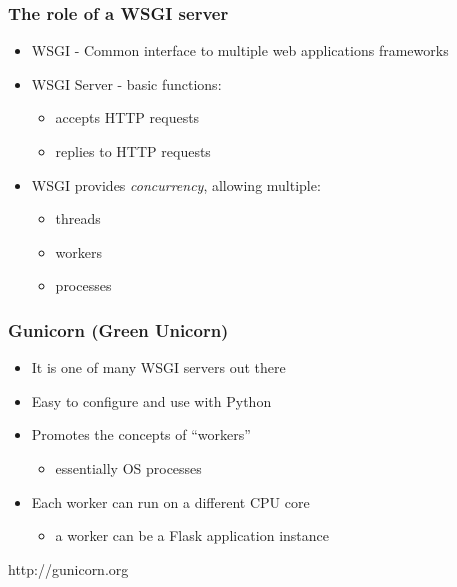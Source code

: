 \documentclass{beamer}
\begin{document}
\begin{frame}
\frametitle<presentation>{The role of a WSGI server}

\begin{itemize}
  \item WSGI - Common interface to multiple web applications frameworks
  \item WSGI Server - basic functions:
  \begin{itemize}
    \item accepts HTTP requests
    \item replies to HTTP requests
  \end{itemize}
  \item WSGI provides \textit{concurrency}, allowing multiple:
  \begin{itemize}
    \item threads
    \item workers
    \item processes
  \end{itemize}
\end{itemize}
\end{frame}

\begin{frame}
\frametitle<presentation>{Gunicorn (Green Unicorn)}


\begin{itemize}
  \item It is one of many WSGI servers out there
  \item Easy to configure and use with Python
  \item Promotes the concepts of ``workers''
  \begin{itemize} \item essentially OS processes \end{itemize}
  \item Each worker can run on a different CPU core
  \begin{itemize} \item a worker can be a Flask application instance
  \end{itemize}
\end{itemize}

\centering
\footnotesize{http://gunicorn.org}

\end{frame}
\end{document}
